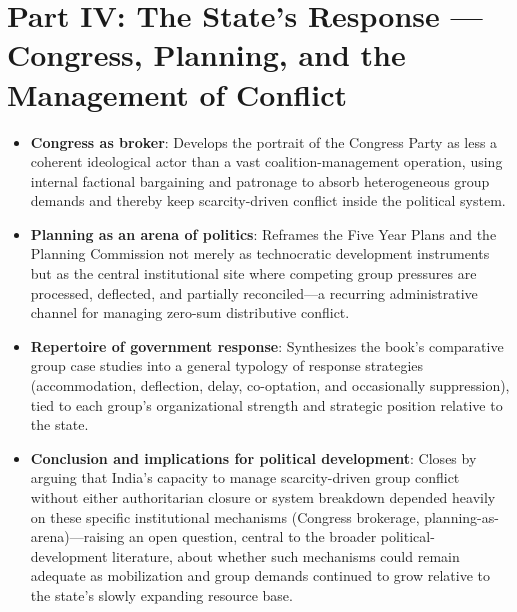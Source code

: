 \documentclass[12pt]{article}
\begin{document}
\section{Part IV: The State's Response --- Congress, Planning, and the Management of Conflict}

\begin{itemize}[leftmargin=*, itemsep=4pt]
    \item \textbf{Congress as broker}: Develops the portrait of the Congress Party as less a coherent ideological actor than a vast coalition-management operation, using internal factional bargaining and patronage to absorb heterogeneous group demands and thereby keep scarcity-driven conflict inside the political system.
    \item \textbf{Planning as an arena of politics}: Reframes the Five Year Plans and the Planning Commission not merely as technocratic development instruments but as the central institutional site where competing group pressures are processed, deflected, and partially reconciled---a recurring administrative channel for managing zero-sum distributive conflict.
    \item \textbf{Repertoire of government response}: Synthesizes the book's comparative group case studies into a general typology of response strategies (accommodation, deflection, delay, co-optation, and occasionally suppression), tied to each group's organizational strength and strategic position relative to the state.
    \item \textbf{Conclusion and implications for political development}: Closes by arguing that India's capacity to manage scarcity-driven group conflict without either authoritarian closure or system breakdown depended heavily on these specific institutional mechanisms (Congress brokerage, planning-as-arena)---raising an open question, central to the broader political-development literature, about whether such mechanisms could remain adequate as mobilization and group demands continued to grow relative to the state's slowly expanding resource base.
\end{itemize}
\end{document}
